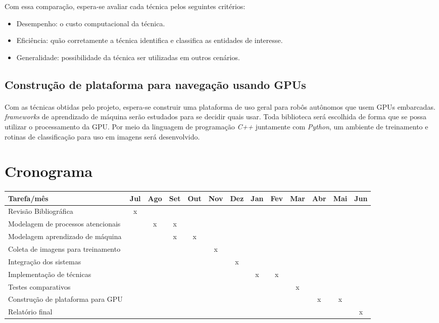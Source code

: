 \documentclass[11pt]{article}
\newcommand{\tit}[1]{\textit{#1}}
\begin{document}
Com essa comparação, espera-se avaliar cada técnica pelos seguintes critérios:
\begin{itemize}
	\item Desempenho: o custo computacional da técnica.
	\item Eficiência: quão corretamente a técnica identifica e classifica
		as entidades de interesse.
	\item Generalidade: possibilidade da técnica ser utilizadas em outros 
		cenários.
\end{itemize}

\subsection{Construção de plataforma para navegação usando GPUs}
\paragraph{}
Com as técnicas obtidas pelo projeto, espera-se construir uma plataforma
de uso geral para robôs autônomos que usem GPUs embarcadas.
\tit{frameworks} de aprendizado de máquina serão estudados para se decidir
quais usar. 
Toda biblioteca será escolhida de forma que se possa utilizar o processamento
da GPU.
Por meio da linguagem de programação \tit{C++} juntamente com \tit{Python},  
um ambiente de treinamento e rotinas de classificação para uso em imagens
será desenvolvido.

\section{Cronograma}
\paragraph{}
\begin{table}[H]
\setlength{\tabcolsep}{.16667em}
\begin{tabular}{|C{5cm}|c|c|c|c|c|c|c|c|c|c|c|c|}
	\hline
	Tarefa/mês & Jul & Ago & Set & Out & Nov & Dez & Jan & Fev & Mar & Abr & Mai & 
	Jun \\
	\hline
	Revisão Bibliográfica & x & & & & & & & & & & & \\
	\hline
	Modelagem de processos atencionais & & x & x & & & & & & & & & \\
	\hline
	Modelagem aprendizado de máquina & & & x & x & & & & & & & & \\
	\hline
	Coleta de imagens para treinamento & & & & & x & & & & & & & \\
	\hline
	Integração dos sistemas & & & & & & x & & & & & & \\
	\hline
	Implementação de técnicas & & & & & & & x & x & & & & \\
	\hline
	Testes comparativos & & & & & & &  & & x & & & \\
	\hline
	Construção de plataforma para GPU & & & & & & & & & & x & x & \\
	\hline
	Relatório final & & & & & & & & & & & & x \\
	\hline
\end{tabular}
\end{table}

\printbibliography
\end{document}
